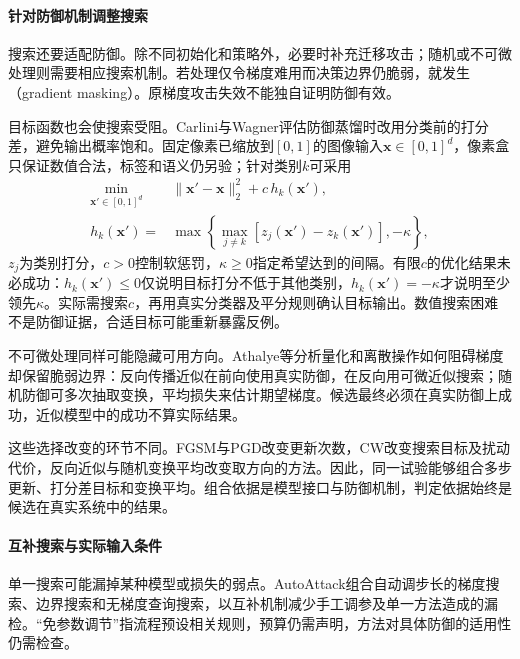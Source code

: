 \paragraph{针对防御机制调整搜索}

搜索还要适配防御。除不同初始化和策略外，必要时补充迁移攻击；随机或不可微处理则需要相应搜索机制。若处理仅令梯度难用而决策边界仍脆弱，就发生（gradient masking）。原梯度攻击失效不能独自证明防御有效。

目标函数也会使搜索受阻。Carlini与Wagner评估防御蒸馏时改用分类前的打分差，避免输出概率饱和。固定像素已缩放到$[0,1]$的图像输入$\bm{x}\in[0,1]^d$，像素盒只保证数值合法，标签和语义仍另验；针对类别$k$可采用
\begin{equation}
 \begin{aligned}
 \min_{\bm{x}'\in[0,1]^d}\quad&
 \|\bm{x}'-\bm{x}\|_2^2+c\,h_k(\bm{x}'),\\
 h_k(\bm{x}')={}&
 \max\left\{\max_{j\ne k}
 [z_j(\bm{x}')-z_k(\bm{x}')],-\kappa\right\},
 \end{aligned}
 \label{eq:security-cw}
\end{equation}
$z_j$为类别打分，$c>0$控制软惩罚，$\kappa\geq0$指定希望达到的间隔。有限$c$的优化结果未必成功：$h_k(\bm{x}')\leq0$仅说明目标打分不低于其他类别，$h_k(\bm{x}')=-\kappa$才说明至少领先$\kappa$。实际需搜索$c$，再用真实分类器及平分规则确认目标输出。数值搜索困难不是防御证据，合适目标可能重新暴露反例。

不可微处理同样可能隐藏可用方向。Athalye等分析量化和离散操作如何阻碍梯度却保留脆弱边界：反向传播近似在前向使用真实防御，在反向用可微近似搜索；随机防御可多次抽取变换，平均损失来估计期望梯度。候选最终必须在真实防御上成功，近似模型中的成功不算实际结果。

这些选择改变的环节不同。FGSM与PGD改变更新次数，CW改变搜索目标及扰动代价，反向近似与随机变换平均改变取方向的方法。因此，同一试验能够组合多步更新、打分差目标和变换平均。组合依据是模型接口与防御机制，判定依据始终是候选在真实系统中的结果。

\paragraph{互补搜索与实际输入条件}

单一搜索可能漏掉某种模型或损失的弱点。AutoAttack组合自动调步长的梯度搜索、边界搜索和无梯度查询搜索，以互补机制减少手工调参及单一方法造成的漏检。“免参数调节”指流程预设相关规则，预算仍需声明，方法对具体防御的适用性仍需检查。

